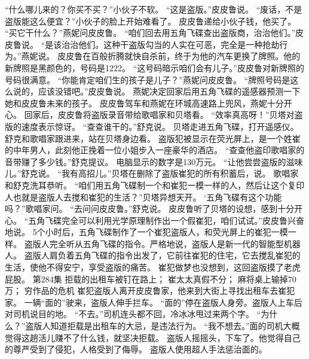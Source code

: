 \documentclass[a4paper,12pt,UTF8,twoside]{ctexbook}
\begin{document}
        “什么哪儿来的？你买不买？”小伙子不软。  
        “这是盗版。”皮皮鲁说。  
        “废话，不是盗版能这么便宜？”小伙子的脸上开始难看了。  
        皮皮鲁递给小伙子钱，他买了。  
        “买它干什么？”燕妮问皮皮鲁。  
        “咱们回去用五角飞碟查出盗版商，治治他们。”皮皮鲁说。  
        “是该治治他们。这种干盗版勾当的人实在可恶，完全是一种抢劫行为。”燕妮说。        
        皮皮鲁在百般折腾就快自杀前，终于为他的汽车更换了牌照。他的新牌照是黑颜色的，号码是1222。  
        “这号码暗示咱们会有儿子。”皮皮鲁对新牌照的号码很满意。  
        “你能肯定咱们生的孩子是儿子？”燕妮问皮皮鲁。  
        “牌照号码是这么说的，应该没错吧。”皮皮鲁说。  
        燕妮决定回家后用五角飞碟的遥感器预测一下她和皮皮鲁未来的孩子。  
        皮皮鲁驾车和燕妮在环城高速路上兜风，燕妮十分开心。  
        回家后，皮皮鲁将盗版录音带给歌唱家和贝塔看。  
        “效率真高呀！”贝塔对盗版的速度表示惊讶。  
        “查查谁干的。”舒克说。  
        贝塔走进五角飞碟，打开遥感仪。  
        舒克和歌唱家跟进来，站在贝塔身边看。  
        盗版犯被显示在荧光屏上，是一个姓崔的中年男人，此刻他正挽着一位小姐步入一座豪华的酒店。  
        “查查他盗印歌唱家的音带赚了多少钱。”舒克提议。  
        电脑显示的数字是130万元。        
        “让他尝尝盗版的滋味儿。”舒克说。  
        “我有高招儿。”贝塔在删除了盗版崔犯的所有积蓄后，说。  
        歌唱家和舒克洗耳恭听。  
        “咱们用五角飞碟制一个和崔犯一模一样的人，然后让这个复印人也就是盗版人去搅和崔犯的生活？”贝塔异想天开。  
        ‘五角飞碟有这个功能吗？”歌唱家问。  
        “去问问皮皮鲁。”舒克说。  
        皮皮鲁听了贝塔的设想，感到十分开心。  
        “五角飞碟完全可以利用光学原理制作出一个假崔犯，咱们试试。”皮皮鲁兴奋地说。  
        5个小时后，五角飞碟制作了一个崔犯盗版人，和荧光屏上的崔犯一模一样。  
        盗版人完全听从五角飞碟的指令。严格地说，盗版人是新一代的智能型机器人。  
        盗版人肩负着五角飞碟的指令出发了，它前往崔犯的住宅，它去搅乱崔犯的生活，使他不得安宁，享受盗版的痛苦。  
        崔犯做梦也没想到，这回盗版摸了老虎屁股。          第284集  
        拒载的出租车被钉在路上；  
        崔太太真假不分；  
        麻将桌上输掉70万；  
        穷作品的危机    
        崔犯盗版人离开皮皮鲁家，他来到大街上寻找出租车去崔犯家。  
        一辆“面的”驶来，盗版人伸手拦车。  
        “面的”停在盗版人身旁。盗版人上车后对司机说目的地。  
        “不去。”司机连头都不回，冷冰冰甩过来两个字。  
        “为什么？”盗版人知道拒载是出租车的大忌，是违法行为。  
        “我不想去。”面的司机大概觉得这趟活儿赚不了什么钱，就坚决拒载。        
        盗版人摇摇头，下车了。他觉得自己的尊严受到了侵犯，人格受到了侮辱。  
        盗版人使用超人手法惩治面的。  
\end{document}
